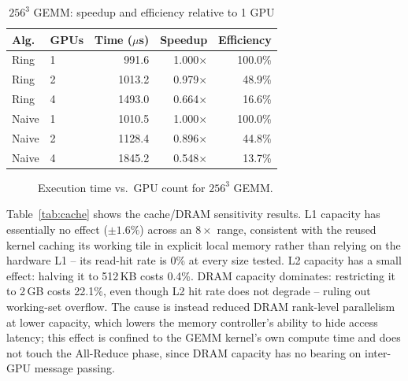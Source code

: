 \documentclass[conference]{IEEEtran}
\begin{document}
\begin{table}[htbp]
\caption{$256^3$ GEMM: speedup and efficiency relative to 1 GPU}
\label{tab:scaling}
\centering
\footnotesize
\begin{tabular}{@{}llrrr@{}}
\toprule
Alg. & GPUs & Time ($\mu$s) & Speedup & Efficiency \\
\midrule
Ring  & 1 & 991.6  & 1.000$\times$ & 100.0\% \\
Ring  & 2 & 1013.2 & 0.979$\times$ & 48.9\% \\
Ring  & 4 & 1493.0 & 0.664$\times$ & 16.6\% \\
Naive & 1 & 1010.5 & 1.000$\times$ & 100.0\% \\
Naive & 2 & 1128.4 & 0.896$\times$ & 44.8\% \\
Naive & 4 & 1845.2 & 0.548$\times$ & 13.7\% \\
\bottomrule
\end{tabular}
\end{table}

\begin{figure}[htbp]
\centering
{}
\caption{Execution time vs.\ GPU count for $256^3$ GEMM.}
\label{fig:scaling}
\end{figure}

Table~\ref{tab:cache} shows the cache/DRAM sensitivity results. L1 capacity has essentially no effect ($\pm1.6\%$) across an $8\times$ range, consistent with the reused kernel caching its working tile in explicit local memory rather than relying on the hardware L1 -- its read-hit rate is 0\% at every size tested. L2 capacity has a small effect: halving it to 512\,KB costs 0.4\%. DRAM capacity dominates: restricting it to 2\,GB costs 22.1\%, even though L2 hit rate does not degrade -- ruling out working-set overflow. The cause is instead reduced DRAM rank-level parallelism at lower capacity, which lowers the memory controller's ability to hide access latency; this effect is confined to the GEMM kernel's own compute time and does not touch the All-Reduce phase, since DRAM capacity has no bearing on inter-GPU message passing.
\end{document}
